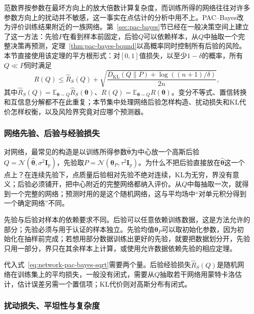 范数界按参数在最坏方向上的放大倍数计算复杂度，而训练所得的网络往往对许多参数方向上的扰动并不敏感，这一事实在点估计的分析中用不上。PAC--Bayes改为评价训练结果附近的一族网络。第~\ref{sec:pac-bayes}节已经在一般决策空间上建立了这一方法：先验$P$在看到样本前固定，后验$Q$可以依赖样本，从$Q$中抽取一个完整决策再预测，定理~\ref{thm:pac-bayes-bound}以高概率同时控制所有后验的风险。本节直接使用该定理的平方根形式：对$[0,1]$值损失，以至少$1-\delta$的概率，所有$Q\ll P$同时满足
\begin{equation}
 R(Q)\leq\hat R_S(Q)+\sqrt{\frac{D_{\mathrm{KL}}(Q\|P)+\log((n+1)/\delta)}{2n}},
 \label{eq:network-pac-bayes-sqrt}
\end{equation}
其中$\hat R_S(Q)=\mathbb E_{\bm\theta\sim Q}\hat R_S(\bm\theta)$、$R(Q)=\mathbb E_{\bm\theta\sim Q}R(\bm\theta)$。变分不等式、置信转换和互信息分解都不在此重复；本节集中处理网络后验怎样构造、扰动损失和KL代价怎样权衡，以及风险界究竟对应哪个预测器。

\subsubsection{网络先验、后验与经验损失}

对网络，最常见的构造是以训练所得参数$\hat{\bm\theta}$为中心放一个高斯后验$Q=\mathcal N(\hat{\bm\theta},\sigma^2\bm I_p)$，先验取$P=\mathcal N(\bm\theta_P,\tau^2\bm I_p)$。为什么不把后验直接放在$\hat{\bm\theta}$这一个点上？在连续先验下，点质量后验相对先验不绝对连续，KL为无穷，界没有意义；后验必须铺开，把中心附近的完整网络都纳入评价。从$Q$中每抽取一次，就得到一个完整的网络；预测时用的是这个随机网络，这与平均场中“对单元积分得到一个确定网络”不同。

先验与后验对样本的依赖要求不同。后验可以任意依赖训练数据，这是方法允许的部分；先验必须与用于认证的样本独立。先验均值$\bm\theta_P$可以取初始化参数，因为初始化在抽样前完成；若想用部分数据训练出更好的先验，就要把数据划分开，先验只用一部分，界只在其余样本上计算，或使用允许数据依赖先验的相应定理。

代入式~\eqref{eq:network-pac-bayes-sqrt}需要两个量。后验经验损失$\hat R_S(Q)$是随机网络在训练集上的平均损失，一般没有闭式，需要从$Q$抽取若干网络用蒙特卡洛估计，估计误差另需一个置信项；KL代价则对高斯分布有闭式。

\subsubsection{扰动损失、平坦性与复杂度}

